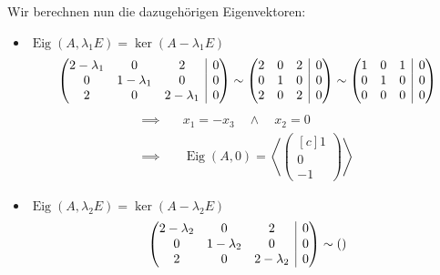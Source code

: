 \documentclass[answers]{exam}
\makeatletter
\newenvironment{sysmatrix}[1]
  {\left(\begin{array}{@{}#1@{}}}
  {\end{array}\right)}
\newcommand{\scalarprod}[1]{\left\langle #1 \right\rangle}
\newcommand{\vektor}[1]{\begin{pmatrix*}[c] #1 \end{pmatrix*}}
\newcommand{\Eig}{\operatorname{Eig}}
\makeatother
\begin{document}
\begin{questions}
\begin{solution}
        Wir berechnen nun die dazugehörigen Eigenvektoren:
        \begin{itemize}
            \item $\Eig(A, \lambda_1 E) = \ker(A - \lambda_1E)$
                  $$
                      \begin{sysmatrix}{ccc|c}
                          2 - \lambda_1 & 0 & 2 & 0 \\
                          0 & 1 - \lambda_1 & 0 & 0 \\
                          2 & 0 & 2 - \lambda_1 & 0
                      \end{sysmatrix}
                      \sim
                      \begin{sysmatrix}{ccc|c}
                          2 & 0 & 2 & 0 \\
                          0 & 1 & 0 & 0 \\
                          2 & 0 & 2 & 0
                      \end{sysmatrix}
                      \sim
                      \begin{sysmatrix}{ccc|c}
                          1 & 0 & 1 & 0 \\
                          0 & 1 & 0 & 0 \\
                          0 & 0 & 0 & 0
                      \end{sysmatrix}
                  $$
                  $$
                      \begin{aligned}
                          \implies & \quad x_1 = -x_3 \quad \land \quad x_2 = 0 \\
                          \implies & \quad \Eig(A, 0) = \scalarprod{\vektor{1   \\0\\-1}}
                      \end{aligned}
                  $$
            \item $\Eig(A, \lambda_2 E) = \ker(A - \lambda_2E)$
                  $$
                      \begin{sysmatrix}{ccc|c}
                          2 - \lambda_2 & 0 & 2 & 0 \\
                          0 & 1 - \lambda_2 & 0 & 0 \\
                          2 & 0 & 2 - \lambda_2 & 0
                      \end{sysmatrix}
                      \sim
                      \begin{sysmatrix}{ccc|c}

\end{sysmatrix}$$
\end{itemize}
\end{solution}
\end{questions}
\end{document}
